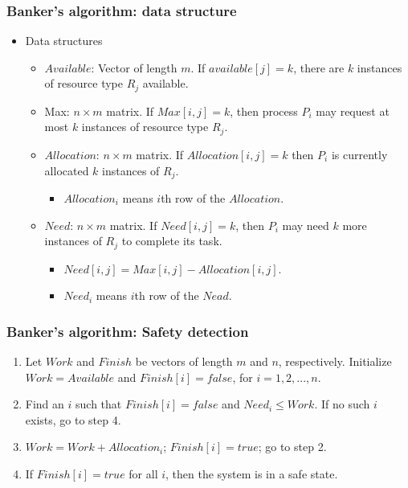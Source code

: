 \documentclass[CJKutf8,dvipsnames,table]{beamer}
\begin{document}
\begin{CJK*}{UTF8}{song}
\begin{frame}
\begin{itemize}
  \end{itemize}
  \end{frame}

  \begin{frame}
  \frametitle{Banker's algorithm: data structure} \pause
  \begin{itemize}
  \item Data structures  \pause
    \begin{itemize}
    \item $Available$:  Vector of length $m$. If $available[j] = k$, there are $k$ instances of resource type $R_j$ available.  \pause
    \item Max: $n \times m$ matrix.  If $Max[i,j] = k$, then process $P_i$ may request at most $k$ instances of resource type $R_j$.  \pause
    \item $Allocation$:  $n \times m$ matrix.  If $Allocation[i,j] = k$ then $P_i$ is currently allocated $k$ instances of $R_j$.  \pause
      \begin{itemize}
      \item $Allocation_i$ means $i$th row of the $Allocation$.  \pause
      \end{itemize}
    \item $Need$:  $n \times m$ matrix. If $Need[i,j] = k$, then $P_i$ may need $k$ more instances of $R_j$ to complete its task.  \pause
      \begin{itemize}
      \item $Need[i,j] = Max[i,j] - Allocation [i,j]$.  \pause
      \item $Need_i$ means $i$th row of the $Nead$. 
      \end{itemize}
    \end{itemize}
  \end{itemize}
  \end{frame}

  \begin{frame}
  \frametitle{Banker's algorithm: Safety detection} \pause
  \begin{enumerate}
  \item Let $Work$ and $Finish$ be vectors of length $m$ and $n$, respectively. Initialize $Work = Available$ and $Finish[i] = false$, for $i=1, 2, ..., n$.  \pause
  \item{Find an $i$ such that \pause
      \newline
      $Finish[i] = false$ and $Need_i \leq Work$. \pause
      \newline
      If no such $i$ exists, go to step 4. \pause
    }
  \item $Work = Work + Allocation_i$; $Finish[i] = true$; \newline go to step 2.  \pause
  \item If $Finish[i] = true$ for all $i$, then the system is in a safe state.  \pause
  \end{enumerate}
  \end{frame}


\end{CJK*}
\end{document}
